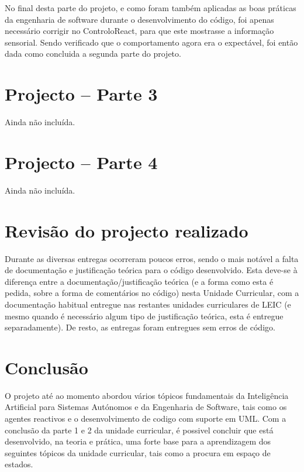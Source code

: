 \documentclass[a4paper,12pt]{article}
\begin{document}
No final desta parte do projeto, e como foram também aplicadas as boas práticas da engenharia de software durante o desenvolvimento do código, foi apenas necessário corrigir no ControloReact, para que este mostrasse a informação sensorial.
Sendo verificado que o comportamento agora era o expectável, foi então dada como concluida a segunda parte do projeto.

\newpage
\section{Projecto – Parte 3}
Ainda não incluída.

\newpage
\section{Projecto – Parte 4}
Ainda não incluída.

\newpage
\section{Revisão do projecto realizado}
Durante as diversas entregas ocorreram poucos erros, sendo o mais notável a falta de documentação e justificação teórica para o código desenvolvido. Esta deve-se à diferença entre a documentação/justificação teórica (e a forma como esta é pedida, sobre a forma de comentários no código) nesta Unidade Curricular, com a documentação habitual entregue nas restantes unidades curriculares de LEIC (e mesmo quando é necessário algum tipo de justificação teórica, esta é entregue separadamente). De resto, as entregas foram entregues sem erros de código.

\newpage
\section{Conclusão}
O projeto até ao momento abordou vários tópicos fundamentais da Inteligência Artificial para Sistemas Autónomos e da Engenharia de Software, tais como os agentes reactivos e o desenvolvimento de codigo com suporte em UML.
Com a conclusão da parte 1 e 2 da unidade curricular, é possivel concluir que está desenvolvido, na teoria e prática, uma forte base para a aprendizagem dos seguintes tópicos da unidade curricular, tais como a procura em espaço de estados.

\newpage
\nocite{*}
\printbibliography[heading=bibintoc]
\end{document}
